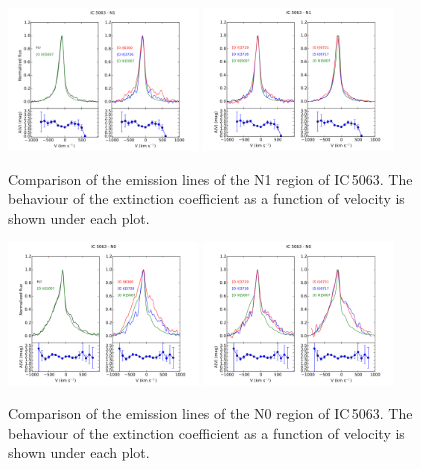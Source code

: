 \documentclass[../thesis.tex]{subfiles}
\begin{document}
\begin{figure}
\centering
\includegraphics[width=0.45\textwidth]{images/paper1/IC5063_n1_l1.pdf} \quad
\includegraphics[width=0.45\textwidth]{images/paper1/IC5063_n1_l2.pdf}\\
\caption[]{Comparison of the emission lines of the N1 region of IC\,5063. The behaviour of the extinction coefficient as a function of velocity is shown under each plot.}
\label{fig:n1l1_I}
\end{figure}


\begin{figure}
\centering
\includegraphics[width=0.45\textwidth]{images/paper1/IC5063_n0_l1.pdf} \quad
\includegraphics[width=0.45\textwidth]{images/paper1/IC5063_n0_l2.pdf}\\
\caption[]{Comparison of the emission lines of the N0 region of IC\,5063. The behaviour of the extinction coefficient as a function of velocity is shown under each plot.}
\label{fig:n0l1_I}
\end{figure}
\end{document}
